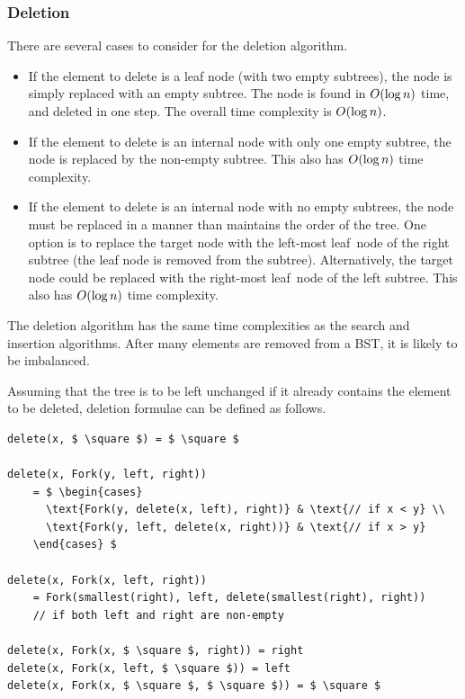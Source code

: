 \subsubsection{Deletion}

There are several cases to consider for the deletion algorithm.
\begin{itemize}
  \item If the element to delete is a leaf node (with two empty subtrees), the node is simply replaced with an empty subtree.
  The node is found in \( O\!\left(\log n\right) \) time, and deleted in one step.
  The overall time complexity is \( O\!\left(\log n\right) \).
  \item If the element to delete is an internal node with only one empty subtree, the node is replaced by the non-empty subtree.
  This also has \( O\!\left(\log n\right) \) time complexity.
  \item If the element to delete is an internal node with no empty subtrees, the node must be replaced in a manner than maintains the order of the tree.
  One option is to replace the target node with the left-most leaf~node of the right subtree (the leaf node is removed from the subtree).
  Alternatively, the target node could be replaced with the right-most leaf~node of the left subtree.
  This also has \( O\!\left(\log n\right) \) time complexity.
\end{itemize}

The deletion algorithm has the same time complexities as the search and insertion algorithms.
After many elements are removed from a BST, it is likely to be imbalanced.

Assuming that the tree is to be left unchanged if it already contains the element to be deleted, deletion formulae can be defined as follows.
\begin{lstlisting}[mathescape=true]
delete(x, $ \square $) = $ \square $

delete(x, Fork(y, left, right))
    = $ \begin{cases}
      \text{Fork(y, delete(x, left), right)} & \text{// if x < y} \\
      \text{Fork(y, left, delete(x, right))} & \text{// if x > y}
    \end{cases} $

delete(x, Fork(x, left, right))
    = Fork(smallest(right), left, delete(smallest(right), right))
    // if both left and right are non-empty

delete(x, Fork(x, $ \square $, right)) = right
delete(x, Fork(x, left, $ \square $)) = left
delete(x, Fork(x, $ \square $, $ \square $)) = $ \square $
\end{lstlisting}

